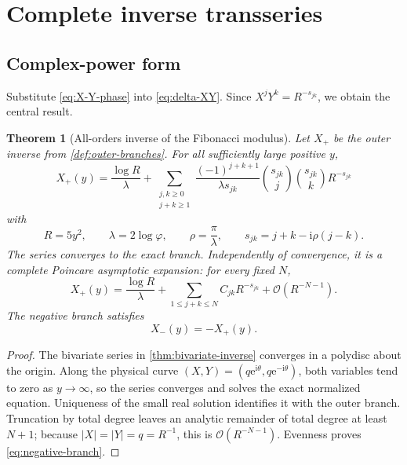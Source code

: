 \documentclass[11pt,oneside]{article}
\numberwithin{equation}{section}
\theoremstyle{plain}
\newtheorem{theorem}{Theorem}[section]
\theoremstyle{definition}
\theoremstyle{remark}
\newcommand{\e}{\mathrm e}
\newcommand{\ii}{\mathrm i}
\newcommand{\Ord}{\mathcal O}
\begin{document}
\section{Complete inverse transseries}\label{sec:complete-transseries}

\subsection{Complex-power form}

Substitute \cref{eq:X-Y-phase} into \cref{eq:delta-XY}.  Since
\(X^jY^k=R^{-s_{jk}}\), we obtain the central result.

\begin{theorem}[All-orders inverse of the Fibonacci modulus]\label{thm:all-orders}
Let \(X_+\) be the outer inverse from \cref{def:outer-branches}.  For all
sufficiently large positive \(y\),
\begin{equation}\label{eq:all-orders-complex}
 \boxed{
 X_+(y)=\frac{\log R}{\lambda}
 +\sum_{\substack{j,k\ge0\\j+k\ge1}}
 \frac{(-1)^{j+k+1}}{\lambda s_{jk}}
 \binom{s_{jk}}j\binom{s_{jk}}k R^{-s_{jk}}
 }
\end{equation}
with
\begin{equation}\label{eq:R-lambda-rho-again}
 R=5y^2,
 \qquad \lambda=2\log\varphi,
 \qquad \rho=\frac\pi\lambda,
 \qquad s_{jk}=j+k-\ii\rho(j-k).
\end{equation}
The series converges to the exact branch.  Independently of convergence,
it is a complete Poincare asymptotic expansion: for every fixed \(N\),
\begin{equation}\label{eq:truncation-complex}
 X_+(y)=\frac{\log R}{\lambda}
 +\sum_{1\le j+k\le N}C_{jk}R^{-s_{jk}}
 +\Ord(R^{-N-1}).
\end{equation}
The negative branch satisfies
\begin{equation}\label{eq:negative-branch}
 X_-(y)=-X_+(y).
\end{equation}
\end{theorem}

\begin{proof}
The bivariate series in \cref{thm:bivariate-inverse} converges in a
polydisc about the origin.  Along the physical curve
\((X,Y)=(q\e^{\ii\theta},q\e^{-\ii\theta})\), both variables tend to zero
as \(y\to\infty\), so the series converges and solves the exact normalized
equation.  Uniqueness of the small real solution identifies it with the
outer branch.  Truncation by total degree leaves an analytic remainder of
total degree at least \(N+1\); because \(|X|=|Y|=q=R^{-1}\), this is
\(\Ord(R^{-N-1})\).  Evenness proves \cref{eq:negative-branch}.
\end{proof}
\end{document}
